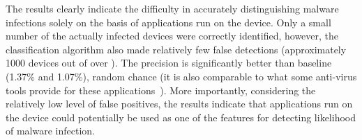 The results clearly indicate the difficulty in accurately distinguishing malware
infections solely on the basis of applications run
on the device. Only a small number of the actually infected devices were
correctly identified, however, the classification algorithm also made
relatively few false detections (approximately 1000 devices out of
over ).  The precision is significantly better than
baseline (1.37\% and 1.07\%), random chance (it is also comparable to
what some anti-virus tools provide for these
applications~\cite{zhou_dissecting_2012}). More importantly, considering
the relatively low level of false positives, the results indicate that
applications run on the device could potentially be used as one of the
features for detecting likelihood of malware infection.

\ifwww
{}
\newcommand\rownumber{\stepcounter{magicrownumbers}\arabic{magicrownumbers}}
